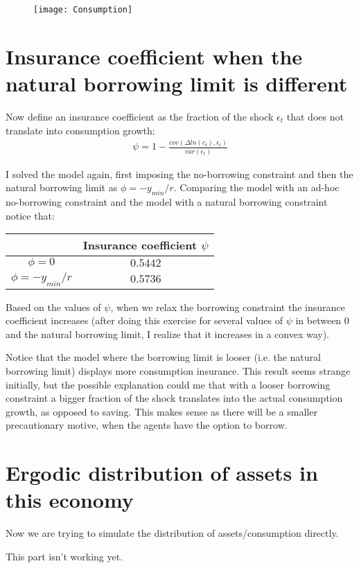 \documentclass[letter,11pt]{article}
\begin{document}
\begin{figure}[h!]
  \centering
        \texttt{[image: Consumption]}
  \end{figure}


\section{Insurance coefficient when the natural borrowing limit is different}
\hfill

Now define an insurance coefficient as the fraction of the shock $\epsilon_t$ that does not translate into consumption growth:
\begin{align*}
\psi = 1- \frac{cov(\Delta ln (c_t),\epsilon_t)}{var(\epsilon_t)}
\end{align*}

I solved the model again, first imposing the no-borrowing constraint and then the natural borrowing limit as  $\phi = -y_{min}/r$. Comparing the model with an ad-hoc no-borrowing constraint and the model with a natural borrowing constraint  notice that:

\begin{tabular}{ c| c  }
   & Insurance coefficient $\psi$ \\ \hline
$\phi = 0$ & $0.5442$ \\ 
$\phi = -y_{min}/r$ & $0.5736$ \\  \hline
\end{tabular}

Based on the values of $\psi$, when we relax the borrowing constraint the insurance coefficient increases (after doing this exercise for several values of $\psi$ in between 0 and the natural borrowing limit, I realize that it increases in a convex way).

Notice that the model where the borrowing limit is looser (i.e. the natural borrowing limit) displays more consumption insurance. This result seems strange initially, but the possible explanation could me that with a looser borrowing constraint a bigger fraction of the shock translates into the actual consumption growth, as opposed to saving. This makes sense as there will be a smaller precautionary motive, when  the agents have the option to borrow.

\section{Ergodic distribution of assets in this economy}
\hfill

Now we are trying to simulate the distribution of assets/consumption directly. 

This part isn't working yet.

\clearpage
 

\clearpage
 

\clearpage

\end{document}
